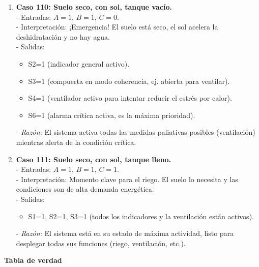 \begin{enumerate}
    \item \textbf{Caso 110: Suelo seco, con sol, tanque vacío.}\\
    - Entradas: $A=1$, $B=1$, $C=0$.\\
    - Interpretación: ¡Emergencia! El suelo está seco, el sol acelera la deshidratación y no hay agua.\\
    - Salidas:
        \begin{itemize}
            \item S2=1 (indicador general activo).
            \item S3=1 (compuerta en modo coherencia, ej. abierta para ventilar).
            \item S4=1 (ventilador activo para intentar reducir el estrés por calor).
            \item S6=1 (alarma crítica activa, es la máxima prioridad).
        \end{itemize}
    - \emph{Razón:} El sistema activa todas las medidas paliativas posibles (ventilación) mientras alerta de la condición crítica.

    \item \textbf{Caso 111: Suelo seco, con sol, tanque lleno.}\\
    - Entradas: $A=1$, $B=1$, $C=1$.\\
    - Interpretación: Momento clave para el riego. El suelo lo necesita y las condiciones son de alta demanda energética.\\
    - Salidas:
        \begin{itemize}
            \item S1=1, S2=1, S3=1 (todos los indicadores y la ventilación están activos).
        \end{itemize}
    - \emph{Razón:} El sistema está en su estado de máxima actividad, listo para desplegar todas sus funciones (riego, ventilación, etc.).
\end{enumerate}

\textbf{Tabla de verdad}

